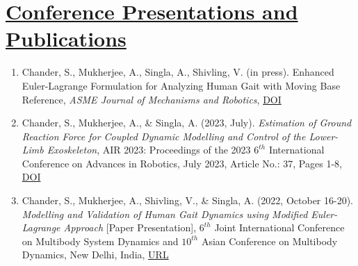 \section{\underline{Conference Presentations and Publications}}
\begin{enumerate}
	\item Chander, S., Mukherjee, A., Singla, A., Shivling, V. (in press). Enhanced Euler-Lagrange Formulation for Analyzing Human Gait with Moving Base Reference, \emph{ASME Journal of Mechanisms and Robotics}, \href{https://doi.org/10.1115/1.4065520}{\large DOI}
	\item Chander, S., Mukherjee, A., \& Singla, A. (2023, July). \emph{Estimation of Ground Reaction Force for Coupled Dynamic Modelling and Control of the Lower-Limb Exoskeleton}, AIR 2023: Proceedings of the 2023 $6^{th}$ International Conference on Advances in Robotics, July 2023, Article No.: 37, Pages 1-8, \href{https://doi.org/10.1145/3610419.3610456  }{\large{DOI}}
	\item Chander, S., Mukherjee, A., Shivling, V., \& Singla, A. (2022, October 16-20). \emph{Modelling and Validation of Human Gait Dynamics using Modified Euler-Lagrange Approach} [Paper Presentation], $6^{th}$ Joint International Conference on Multibody System Dynamics and $10^{th}$ Asian Conference on Multibody Dynamics, New Delhi, India, \href{http://imsdacmd2020.iitd.ac.in/web-abstracts/pdf/WEB_ABSTRACTS/IMSDACMD2020_219.pdf}{\large{URL}}
\end{enumerate}
